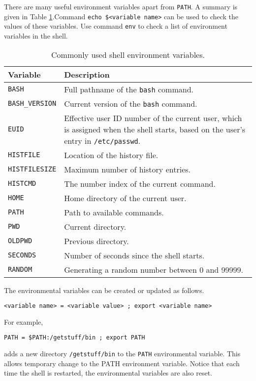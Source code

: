 There are many useful environment variables apart from \verb|PATH|. A summary is given in Table \ref{ch:sb:tab:shellenvironmentvars}.Command \verb|echo $<variable name>| can be used to check the values of these variables. Use command \verb|env| to check a list of environment variables in the shell.

\begin{table}
	\centering \caption{Commonly used shell environment variables.}\label{ch:sb:tab:shellenvironmentvars}
	\begin{tabularx}{\textwidth}{lX}
		\hline
		Variable & Description \\ \hline
		\verb|BASH| & Full pathname of the \verb|bash| command. \\ 
		\verb|BASH_VERSION| & Current version of the \verb|bash| command. \\ 
		\verb|EUID| & Effective user ID number of the current user, which is assigned when the shell starts, based on the user's entry in \verb|/etc/passwd|. \\ 
		\verb|HISTFILE| & Location of the history file. \\ 
		\verb|HISTFILESIZE| & Maximum number of history entries. \\ 
		\verb|HISTCMD| & The number index of the current command. \\ 
		\verb|HOME| & Home directory of the current user. \\ 
		\verb|PATH| & Path to available commands. \\ 
		\verb|PWD| & Current directory. \\ 
		\verb|OLDPWD| & Previous directory. \\ 
		\verb|SECONDS| & Number of seconds since the shell starts. \\ 
		\verb|RANDOM| & Generating a random number between 0 and 99999. \\
		\hline
	\end{tabularx}
\end{table}

The environmental variables can be created or updated as follows.
\begin{lstlisting}
<variable name> = <variable value> ; export <variable name>
\end{lstlisting}
For example,
\begin{lstlisting}
PATH = $PATH:/getstuff/bin ; export PATH
\end{lstlisting}
adds a new directory \verb|/getstuff/bin| to the \verb|PATH| environmental variable. This allows temporary change to the PATH environment variable. Notice that each time the shell is restarted, the environmental variables are also reset. 

